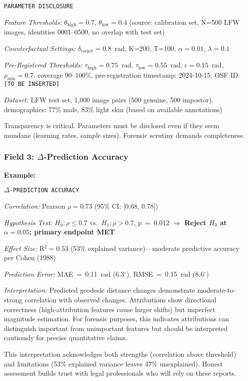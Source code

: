 \texttt{PARAMETER DISCLOSURE}

\textit{Feature Thresholds:} $\theta_{\text{high}} = 0.7$, $\theta_{\text{low}} = 0.4$ (source: calibration set, N=500 LFW images, identities 0001--0500, no overlap with test set)

\textit{Counterfactual Settings:} $\delta_{\text{target}} = 0.8$~rad, K=200, T=100, $\alpha=0.01$, $\lambda=0.1$

\textit{Pre-Registered Thresholds:} $\tau_{\text{high}} = 0.75$~rad, $\tau_{\text{low}} = 0.55$~rad, $\epsilon = 0.15$~rad, $\rho_{\text{min}} = 0.7$, coverage 90--100\%, pre-registration timestamp: 2024-10-15, OSF ID: \texttt{[TO BE INSERTED]}

\textit{Dataset:} LFW test set, 1,000 image pairs (500 genuine, 500 impostor), demographics: 77\% male, 83\% light skin (based on available annotations)

Transparency is critical. Parameters must be disclosed even if they seem mundane (learning rates, sample sizes). Forensic scrutiny demands completeness.

\subsubsection{Field 3: $\Delta$-Prediction Accuracy}

\textbf{Example:}

\texttt{$\Delta$-PREDICTION ACCURACY}

\textit{Correlation:} Pearson $\rho = 0.73$ (95\% CI: [0.68, 0.78])

\textit{Hypothesis Test:} $H_0: \rho \leq 0.7$ vs.\ $H_1: \rho > 0.7$, p~=~0.012 $\Rightarrow$ \textbf{Reject $H_0$ at $\alpha=0.05$; primary endpoint MET}

\textit{Effect Size:} R$^2 = 0.53$ (53\% explained variance)—moderate predictive accuracy per Cohen (1988)

\textit{Prediction Error:} MAE~=~0.11~rad (6.3$^\circ$), RMSE~=~0.15~rad (8.6$^\circ$)

\textit{Interpretation:} Predicted geodesic distance changes demonstrate moderate-to-strong correlation with observed changes. Attributions show directional correctness (high-attribution features cause larger shifts) but imperfect magnitude estimation. For forensic purposes, this indicates attributions can distinguish important from unimportant features but should be interpreted cautiously for precise quantitative claims.

This interpretation acknowledges both strengths (correlation above threshold) and limitations (53\% explained variance leaves 47\% unexplained). Honest assessment builds trust with legal professionals who will rely on these reports.

